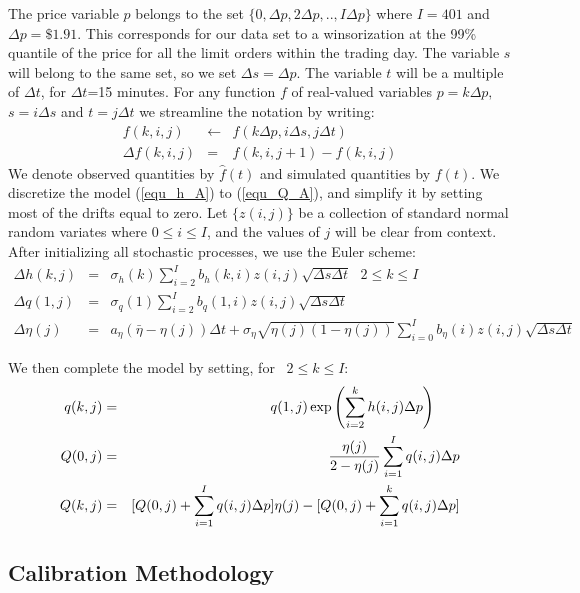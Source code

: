 \documentclass{article}
\begin{document}
The price variable $p$ belongs to the set $\{0,\Delta p,2\Delta p,..,I\Delta
p\}$ where $I=401$ and $\Delta p=\$1.91$. This corresponds for our data set
to a winsorization at the 99\% quantile of the price for all the limit
orders within the trading day. The variable $s$ will belong to the same set,
so we set $\Delta s=\Delta p$. The variable $t$ will be a multiple of $%
\Delta t$, for $\Delta t$=15 minutes. For any function $f$ of real-valued
variables $p=k\Delta p,$ $s=i\Delta s$ and $t=j\Delta t$ we streamline the
notation by writing:
\begin{eqnarray*}
f(k,i,j) &\leftarrow &f(k\Delta p,i\Delta s,j\Delta t) \\
\Delta f(k,i,j) &=&f(k,i,j+1)-f(k,i,j)
\end{eqnarray*}
We denote observed quantities by $\hat{f}(t)$ and simulated quantities by $%
f(t)$. We discretize the model (\ref{equ_h_A}) to (\ref{equ_Q_A}), and
simplify it by setting most of the drifts equal to zero. Let $\{z(i,j)\}$ be
a collection of standard normal random variates where $0\leq i\leq I$, and
the values of $j$ will be clear from context. After initializing all
stochastic processes, we use the Euler scheme:%
\begin{eqnarray}
\Delta h(k,j) &=&\sigma _{h}(k)\sum_{i=2}^{I}b_{h}(k,i)z(i,j)\sqrt{\Delta
s\Delta t}\text{ \ \ \ }2\leq k\leq I  \label{Euler_1} \\
\Delta q(1,j) &=&\sigma _{q}(1)\sum_{i=2}^{I}b_{q}(1,i)z(i,j)\sqrt{\Delta
s\Delta t}  \label{Euler_2} \\
\Delta \eta (j) &=&a_{\eta }(\bar{\eta}-\eta (j))\Delta t+\sigma _{\eta }%
\sqrt{\eta (j)(1-\eta (j))}\sum_{i=0}^{I}b_{\eta }(i)z(i,j)\sqrt{\Delta
s\Delta t}  \label{Euler_3}
\end{eqnarray}

We then complete the model by setting, for \ $2\leq k\leq I$:%
\begin{eqnarray*}
q(k,j) &=&q(1,j)\exp \left( {\sum_{i=2}^{k}h(i,j)\Delta p}\right) \text{ \ \
} \\
Q(0,j) &=&\frac{\eta (j)}{2-\eta (j)}\sum_{i=1}^{I}q(i,j){\Delta p} \\
Q(k,j) &=&[Q(0,j)+\sum_{i=1}^{I}q(i,j)\Delta p]\eta
(j)-[Q(0,j)+\sum_{i=1}^{k}q(i,j)\Delta p]
\end{eqnarray*}

\subsection{Calibration Methodology}
\end{document}
